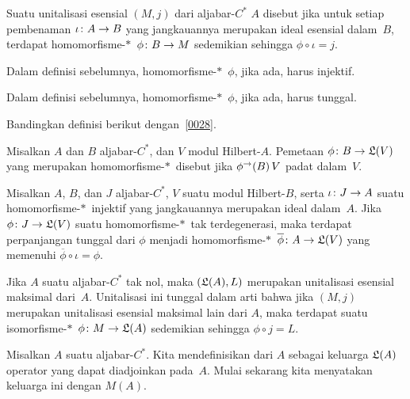\begin{defn} Suatu unitalisasi esensial $(M,j)$ dari aljabar-$C^*$ $A$ disebut
 jika untuk setiap pembenaman $\iota\colon A \rightarrow B$ yang jangkauannya merupakan ideal esensial
dalam~$B$, terdapat homomorfisme-$*\,$ $\phi\colon B \rightarrow M$ sedemikian sehingga $\phi
\circ \iota = j$.
\end{defn}

\begin{prop} Dalam definisi sebelumnya, homomorfisme-$*\,$ $\phi$, jika ada, harus
injektif.
\end{prop}

\begin{prop} Dalam definisi sebelumnya, homomorfisme-$*\,$ $\phi$, jika ada, harus
tunggal.
\end{prop}

Bandingkan definisi berikut dengan~\ref{0028}.

\begin{defn} Misalkan $A$ dan $B$ aljabar-$C^*$, dan $V$ modul Hilbert-$A$. Pemetaan
$\phi\colon B \rightarrow \mathfrak{L}(V)$ yang merupakan homomorfisme-$*\,$ disebut
 jika $\phi^\rightarrow(B)\,V$ padat dalam~$V$.
\end{defn}

\begin{prop} Misalkan $A$, $B$, dan $J$ aljabar-$C^*$, $V$ suatu modul Hilbert-$B$, serta
$\iota\colon J \rightarrow A$ suatu homomorfisme-$*\,$ injektif yang jangkauannya merupakan ideal dalam~$A$.
Jika $\phi\colon J \rightarrow \mathfrak{L}(V)$ suatu homomorfisme-$*\,$ tak terdegenerasi, maka terdapat
perpanjangan tunggal dari $\phi$ menjadi homomorfisme-$*\,$ $\overline\phi\colon A \rightarrow
\mathfrak{L}(V)$ yang memenuhi $\overline\phi \circ \iota = \phi$.
\end{prop}

\begin{prop}\label{0038621} Jika $A$ suatu aljabar-$C^*$ tak nol, maka $(\mathfrak{L}(A),L)$ merupakan
unitalisasi esensial maksimal dari~$A$. Unitalisasi ini tunggal dalam arti bahwa jika $(M,j)$ merupakan
unitalisasi esensial maksimal lain dari $A$, maka terdapat suatu isomorfisme-$*\,$ $\phi
\colon M \rightarrow \mathfrak{L}(A)$ sedemikian sehingga $\phi \circ j = L$.
\end{prop}

\begin{defn}\label{0038641} Misalkan $A$ suatu aljabar-$C^*$. Kita mendefinisikan
 dari $A$ sebagai keluarga $\mathfrak{L}(A)$ operator yang dapat diadjoinkan
pada~$A$. Mulai sekarang kita menyatakan keluarga ini
dengan $M(A)$.
\end{defn}









\endinput
